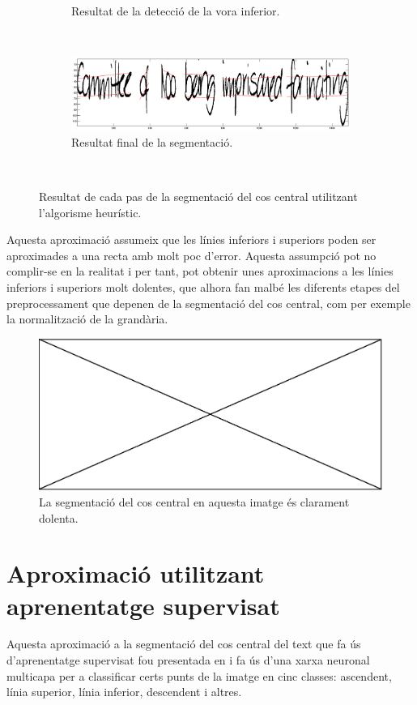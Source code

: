 \begin{figure}
\begin{subfigure}[b]{0.8\textwidth}
\caption{Resultat de la detecció de la vora inferior.}\label{fig:pasos_segmentacio_heuristica_inf}
\end{subfigure}\\
\begin{subfigure}[b]{0.8\textwidth}
\centering
\includegraphics[width=\textwidth]{images/pasos_segmentacio_heuristica_final.eps}
\caption{Resultat final de la segmentació.}\label{fig:pasos_segmentacio_heuristica_final}
\end{subfigure}\\
\caption{Resultat de cada pas de la segmentació del cos central utilitzant l'algorisme heurístic.}\label{fig:pasos_segmentacio_heuristica}
\end{figure}

Aquesta aproximació assumeix que les línies inferiors i superiors poden ser aproximades a una recta amb molt poc d'error. Aquesta assumpció pot no complir-se en la realitat i per tant, pot obtenir unes aproximacions a les línies inferiors i superiors molt dolentes, que alhora fan malbé les diferents etapes del preprocessament que depenen de la segmentació del cos central, com per exemple la normalització de la grandària.

\begin{figure}
\centering
\includegraphics[width=\textwidth]{images/pending_image.eps}
\caption{La segmentació del cos central en aquesta imatge és clarament dolenta.}\label{fig:seg_heur_mal_resultat}
\end{figure}

\section{Aproximació utilitzant aprenentatge supervisat}
\label{sec:seg_nn}
Aquesta aproximació a la segmentació del cos central del text que fa ús d'aprenentatge supervisat fou presentada en \cite{DBLP:conf/pris/Gorbe-MoyaEZB08} i fa ús d'una xarxa neuronal multicapa per a classificar certs punts de la imatge en cinc classes: ascendent, línia superior, línia inferior, descendent i altres.\\

